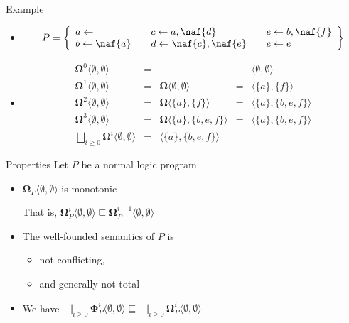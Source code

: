 \begin{frame}{Example}
  \begin{itemize}
  \item<1-> []
    \[
    P
    =
    \left\{
      \begin{array}{lll}
        a \leftarrow                  \quad &
        c \leftarrow a, \naf{d}       \quad &
        e \leftarrow b, \naf{f}
        \\
        b \leftarrow \naf{a}          \quad &
        d \leftarrow \naf{c}, \naf{e} \quad &
        e \leftarrow e
      \end{array}
    \right\}
    \]

  \item<2-> []
    \[
    \begin{array}{rclcl}
      \mathbf{\Omega}^0\langle\emptyset,\emptyset\rangle&=&                                                & &\langle\emptyset,\emptyset\rangle
      \\
      \mathbf{\Omega}^1\langle\emptyset,\emptyset\rangle&=&\mathbf{\Omega}\langle\emptyset,\emptyset\rangle&=&\langle\{a\}    ,\{f\}    \rangle
      \\
      \mathbf{\Omega}^2\langle\emptyset,\emptyset\rangle&=&\mathbf{\Omega}\langle\{a\}    ,\{f\}    \rangle&=&\langle\{a\}    ,\{b,e,f\}\rangle
      \\
      \mathbf{\Omega}^3\langle\emptyset,\emptyset\rangle&=&\mathbf{\Omega}\langle\{a\}    ,\{b,e,f\}\rangle&=&\langle\{a\}    ,\{b,e,f\}\rangle
      \\[10pt]
      \bigsqcup_{i \geq 0}\mathbf{\Omega}^i\langle\emptyset,\emptyset\rangle&=&\langle\{a\},\{b,e,f\}\rangle
    \end{array}
    \]
  \end{itemize}
\end{frame}
\begin{frame}{Properties}
  \bigskip
  Let $P$ be a normal logic program
  \medskip
  \begin{itemize}
  \item ${\mathbf{\Omega}}_P\langle \emptyset, \emptyset \rangle$ is monotonic

    That is,
    \(
    {\mathbf{\Omega}}_P^i\langle \emptyset, \emptyset \rangle
    \sqsubseteq
    {\mathbf{\Omega}}_P^{i+1}\langle \emptyset, \emptyset \rangle
    \)
    \smallskip
  \item The well-founded semantics of $P$ is
    \begin{itemize}
    \item not conflicting,
    \item and generally not total
    \end{itemize}
  \item We have
    \(
    \bigsqcup_{i \geq 0}
    {\mathbf{\Phi}}_P^i \langle \emptyset, \emptyset \rangle
    \sqsubseteq
    \bigsqcup_{i \geq 0} {\mathbf{\Omega}}_P^i \langle
    \emptyset, \emptyset \rangle
    \)
  \end{itemize}
\end{frame}
